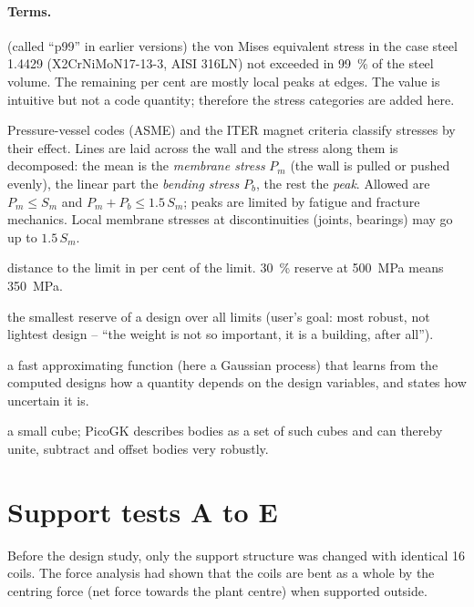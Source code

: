 \documentclass[10pt,a4paper]{article}
\begin{document}
\paragraph{Terms.}
\begin{description}\itemsep2pt
\item[99-\% stress $\sigma_{99}$] (called ``p99'' in earlier versions) the von Mises equivalent stress in the case steel 1.4429
(X2CrNiMoN17-13-3, AISI 316LN) not exceeded in 99~\% of the steel volume. The remaining per cent are mostly local peaks at edges. The value is intuitive but not a
code quantity; therefore the stress categories are added here.
\item[Stress categories] Pressure-vessel codes (ASME) and the ITER magnet criteria classify stresses by their effect.
Lines are laid across the wall and the stress along them is decomposed: the mean is the \emph{membrane stress} $P_m$
(the wall is pulled or pushed evenly), the linear part the \emph{bending stress} $P_b$, the rest the \emph{peak}.
Allowed are $P_m\le S_m$ and $P_m+P_b\le1.5\,S_m$; peaks are limited by fatigue and fracture mechanics. Local membrane
stresses at discontinuities (joints, bearings) may go up to $1.5\,S_m$.
\item[Reserve] distance to the limit in per cent of the limit. 30~\% reserve at \SI{500}{MPa} means \SI{350}{MPa}.
\item[Robustness] the smallest reserve of a design over all limits (user's goal: most robust, not lightest design --
``the weight is not so important, it is a building, after all'').
\item[Surrogate model] a fast approximating function (here a Gaussian process) that learns from the computed designs
how a quantity depends on the design variables, and states how uncertain it is.
\item[Voxel] a small cube; PicoGK describes bodies as a set of such cubes and can thereby unite, subtract and offset
bodies very robustly.
\end{description}

\section{Support tests A to E}\label{sec:tragwerk}
Before the design study, only the support structure was changed with identical 16 coils. The force analysis had shown
that the coils are bent as a whole by the centring force (net force towards the plant centre) when supported outside.
\end{document}
